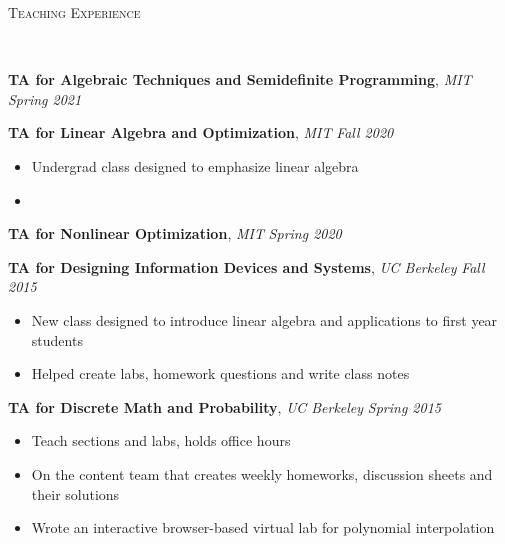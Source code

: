 \documentclass[9pt]{article}
\newenvironment{changemargin}[2]{%
  \begin{list}{}{%
      \setlength{\topsep}{0pt}%
      \setlength{\leftmargin}{#1}%
      \setlength{\rightmargin}{#2}%
      \setlength{\listparindent}{\parindent}%
      \setlength{\itemindent}{\parindent}%
      \setlength{\parsep}{\parskip}%
    }%
  \item[]}{\end{list}
}
\newcommand{\lineover}{
  \begin{changemargin}{-0.05in}{-0.05in}
    \vspace*{-8pt}
    \hrulefill \\
    \vspace*{-2pt}
  \end{changemargin}
}
\newcommand{\header}[1]{
  \begin{changemargin}{-0.5in}{-0.5in}
    \scshape{#1}\\
    \lineover
  \end{changemargin}
}
\newenvironment{body} {
  \vspace*{-16pt}
  \begin{changemargin}{-0.25in}{-0.5in}
  }
  {\end{changemargin}
}
\begin{document}
\begin{body}
\end{body}

\smallskip


\header{Teaching Experience}

\begin{body}
  \vspace{14pt}

  \textbf{TA for Algebraic Techniques and Semidefinite Programming}, \emph{MIT} \hfill \emph{Spring 2021}

  \textbf{TA for Linear Algebra and Optimization}, \emph{MIT} \hfill \emph{Fall 2020}
  \vspace*{-4pt}
  \begin{itemize} \itemsep -0pt  %
  \item Undergrad class designed to emphasize linear algebra
  \item
  \end{itemize}

  \textbf{TA for Nonlinear Optimization}, \emph{MIT} \hfill \emph{Spring 2020}

  \textbf{TA for Designing Information Devices and Systems}, \emph{UC Berkeley} \hfill \emph{Fall 2015}\\
  \vspace*{-4pt}
  \begin{itemize} \itemsep -0pt  %
  \item New class designed to introduce linear algebra and applications to first
    year students
  \item Helped create labs, homework questions and write class notes
  \end{itemize}

  \textbf{TA for Discrete Math and Probability}, \emph{UC Berkeley} \hfill \emph{Spring 2015}\\
  \vspace*{-4pt}
  \begin{itemize} \itemsep -0pt  %
  \item Teach sections and labs, holds office hours
  \item On the content team that creates weekly homeworks, discussion sheets and their solutions
  \item Wrote an interactive browser-based virtual lab for polynomial interpolation
  \end{itemize}


\end{body}
\end{document}
